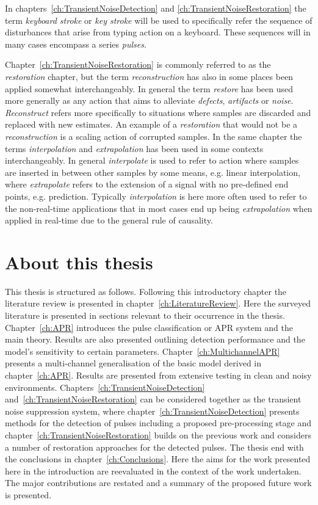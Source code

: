 In chapters~\ref{ch:TransientNoiseDetection} and \ref{ch:TransientNoiseRestoration} the term \emph{keyboard stroke} or \emph{key stroke} will be used to specifically refer the sequence of disturbances that arise from typing action on a keyboard. These sequences will in many cases encompass a series \emph{pulses}.

Chapter~\ref{ch:TransientNoiseRestoration} is commonly referred to as the \emph{restoration} chapter, but the term \emph{reconstruction} has also in some places been applied somewhat interchangeably. In general the term \emph{restore} has been used more generally as any action that aims to alleviate \emph{defects}, \emph{artifacts} or \emph{noise}. \emph{Reconstruct} refers more specifically to situations where samples are discarded and replaced with new estimates. An example of a \emph{restoration} that would not be a \emph{reconstruction} is a scaling action of corrupted samples. In the same chapter the terms \emph{interpolation} and \emph{extrapolation} has been used in some contexts interchangeably. In general \emph{interpolate} is used to refer to action where samples are inserted in between other samples by some means, e.g. linear interpolation, where \emph{extrapolate} refers to the extension of a signal with no pre-defined end points, e.g. prediction. Typically \emph{interpolation} is here more often used to refer to the non-real-time applications that in most cases end up being \emph{extrapolation} when applied in real-time due to the general rule of causality.

\section{About this thesis}
This thesis is structured as follows. Following this introductory chapter the literature review is presented in chapter~\ref{ch:LiteratureReview}. Here the surveyed literature is presented in sections relevant to their occurrence in the thesis. Chapter~\ref{ch:APR} introduces the pulse classification or APR system and the main theory. Results are also presented outlining detection performance and the model's sensitivity to certain parameters. Chapter~\ref{ch:MultichannelAPR} presents a multi-channel generalisation of the basic model derived in chapter~\ref{ch:APR}. Results are presented from extensive testing in clean and noisy environments. Chapters~\ref{ch:TransientNoiseDetection} and~\ref{ch:TransientNoiseRestoration} can be considered together as the transient noise suppression system, where chapter~\ref{ch:TransientNoiseDetection} presents methods for the detection of pulses including a proposed pre-processing stage and chapter~\ref{ch:TransientNoiseRestoration} builds on the previous work and considers a number of restoration approaches for the detected pulses. The thesis end with the conclusions in chapter~\ref{ch:Conclusions}. Here the aims for the work presented here in the introduction are reevaluated in the context of the work undertaken. The major contributions are restated and a summary of the proposed future work is presented.



